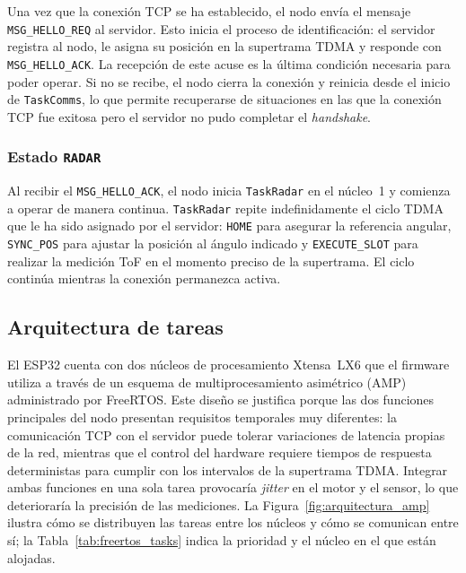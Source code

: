 Una vez que la conexión TCP se ha establecido, el nodo envía el mensaje \texttt{MSG\_HELLO\_REQ} al servidor. Esto inicia el proceso de identificación: el servidor registra al nodo, le asigna su posición en la supertrama TDMA y responde con \texttt{MSG\_HELLO\_ACK}. La recepción de este acuse es la última condición necesaria para poder operar. Si no se recibe, el nodo cierra la conexión y reinicia desde el inicio de \texttt{TaskComms}, lo que permite recuperarse de situaciones en las que la conexión TCP fue exitosa pero el servidor no pudo completar el \textit{handshake}.

\subsubsection*{Estado \texttt{RADAR}}

Al recibir el \texttt{MSG\_HELLO\_ACK}, el nodo inicia \texttt{TaskRadar} en el núcleo~1 y comienza a operar de manera continua. \texttt{TaskRadar} repite indefinidamente el ciclo TDMA que le ha sido asignado por el servidor: \texttt{HOME} para asegurar la referencia angular, \texttt{SYNC\_POS} para ajustar la posición al ángulo indicado y \texttt{EXECUTE\_SLOT} para realizar la medición ToF en el momento preciso de la supertrama. El ciclo continúa mientras la conexión permanezca activa.

\subsection{Arquitectura de tareas}

El ESP32 cuenta con dos núcleos de procesamiento Xtensa~LX6 que el firmware utiliza a través de un esquema de multiprocesamiento asimétrico (AMP) administrado por FreeRTOS. Este diseño se justifica porque las dos funciones principales del nodo presentan requisitos temporales muy diferentes: la comunicación TCP con el servidor puede tolerar variaciones de latencia propias de la red, mientras que el control del hardware requiere tiempos de respuesta deterministas para cumplir con los intervalos de la supertrama TDMA. Integrar ambas funciones en una sola tarea provocaría \textit{jitter} en el motor y el sensor, lo que deterioraría la precisión de las mediciones. La Figura~\ref{fig:arquitectura_amp} ilustra cómo se distribuyen las tareas entre los núcleos y cómo se comunican entre sí; la Tabla~\ref{tab:freertos_tasks} indica la prioridad y el núcleo en el que están alojadas.

